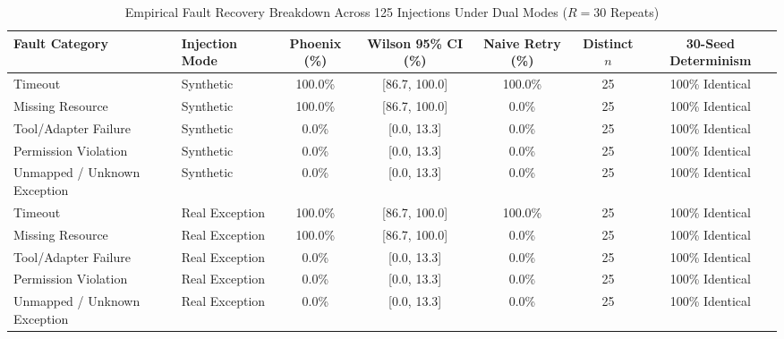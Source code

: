 
\begin{table}[htbp]
\centering
\caption{Empirical Fault Recovery Breakdown Across 125 Injections Under Dual Modes ($R=30$ Repeats)}
\label{tab:empirical_recovery_rates}
\begin{tabular}{llccccc}
\hline
\textbf{Fault Category} & \textbf{Injection Mode} & \textbf{Phoenix (\%)} & \textbf{Wilson 95\% CI (\%)} & \textbf{Naive Retry (\%)} & \textbf{Distinct $n$} & \textbf{30-Seed Determinism} \\
\hline
Timeout & Synthetic & 100.0\% & [86.7, 100.0] & 100.0\% & 25 & 100\% Identical \\
Missing Resource & Synthetic & 100.0\% & [86.7, 100.0] & 0.0\% & 25 & 100\% Identical \\
Tool/Adapter Failure & Synthetic & 0.0\% & [0.0, 13.3] & 0.0\% & 25 & 100\% Identical \\
Permission Violation & Synthetic & 0.0\% & [0.0, 13.3] & 0.0\% & 25 & 100\% Identical \\
Unmapped / Unknown Exception & Synthetic & 0.0\% & [0.0, 13.3] & 0.0\% & 25 & 100\% Identical \\
\hline
Timeout & Real Exception & 100.0\% & [86.7, 100.0] & 100.0\% & 25 & 100\% Identical \\
Missing Resource & Real Exception & 100.0\% & [86.7, 100.0] & 0.0\% & 25 & 100\% Identical \\
Tool/Adapter Failure & Real Exception & 0.0\% & [0.0, 13.3] & 0.0\% & 25 & 100\% Identical \\
Permission Violation & Real Exception & 0.0\% & [0.0, 13.3] & 0.0\% & 25 & 100\% Identical \\
Unmapped / Unknown Exception & Real Exception & 0.0\% & [0.0, 13.3] & 0.0\% & 25 & 100\% Identical \\
\hline
\end{tabular}
\end{table}

